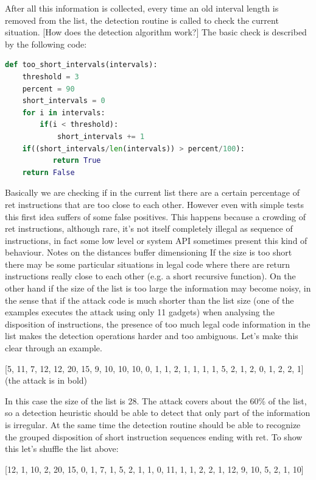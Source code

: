 \documentclass[Lau,binding=0.6cm]{sapthesis}
\begin{document}
After all this information is collected, every time an old interval length is removed from the list, the detection routine is called to check the current situation.
[How does the detection algorithm work?]
The basic check is described by the following code:

\begin{lstlisting}[language=Python]
def too_short_intervals(intervals):
    threshold = 3
    percent = 90
    short_intervals = 0
    for i in intervals:
        if(i < threshold):
            short_intervals += 1
    if((short_intervals/len(intervals)) > percent/100):
           return True
    return False
\end{lstlisting}

Basically we are checking if in the current list there are a certain percentage of ret instructions that are too close to each other. However even with simple tests this first idea suffers of some false positives. This happens because a crowding of ret instructions, although rare, it’s not itself completely illegal as sequence of instructions, in fact some low level or system API sometimes present this kind of behaviour.
Notes on the distances buffer dimensioning
If the size is too short there may be some particular situations in legal code where there are return instructions really close to each other (e.g. a short recursive function). On the other hand if the size of the list is too large the information may become noisy, in the sense that if the attack code is much shorter than the list size (one of the examples executes the attack using only 11 gadgets) when analysing the disposition of instructions, the presence of too much legal code information in the list makes the detection operations harder and too ambiguous.
Let’s make this clear through an example.


[5, 11, 7, 12, 12, 20, 15, 9, 10, 10, 10, 0, 1, 1, 2, 1, 1, 1, 1, 5, 2, 1, 2, 0, 1, 2, 2, 1]
(the attack is in bold)


In this case the size of the list is 28. The attack covers about the 60\% of the list, so a detection heuristic should be able to detect that only part of the information is irregular. At the same time the detection routine should be able to recognize the grouped disposition of short instruction sequences ending with ret. To show this let’s shuffle the list above:


[12, 1, 10, 2, 20, 15, 0, 1, 7, 1, 5, 2, 1, 1, 0, 11, 1, 1, 2, 2, 1, 12, 9, 10, 5, 2, 1, 10]
\end{document}
